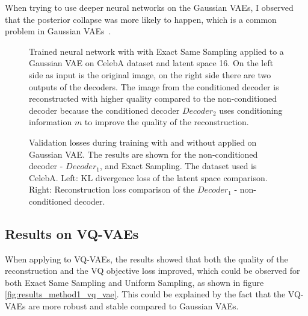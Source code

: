 When trying to use deeper neural networks on the Gaussian VAEs, I observed that the posterior collapse was more likely to happen, which is a common problem in Gaussian VAEs~\cite{wang2023posterior}.

\begin{figure}[H]
    \centering
    
    \caption[Trained neural network with  applied to a Gaussian VAE.]
    { 
        Trained neural network with  with Exact Same Sampling applied to a Gaussian VAE on CelebA dataset and latent space 16. 
        On the left side as input is the original image, on the right side there are two outputs of the decoders. 
        The image from the conditioned decoder is reconstructed with higher quality compared to the non-conditioned decoder because the conditioned decoder $Decoder_2$ uses conditioning information $m$ to improve the quality of the reconstruction.
    }
    \label{fig:res_val}
\end{figure}


\begin{figure}[H]
    \centering
    \scalebox{0.48}{}
    \scalebox{0.48}{}
    \caption[Validation loss during training of a Gaussian VAE.]
    {
        Validation losses during training with and without  applied on Gaussian VAE. The results are shown for the non-conditioned decoder - $Decoder_1$, and Exact Sampling. The dataset used is CelebA.
        Left: KL divergence loss of the latent space comparison. Right: Reconstruction loss comparison of the $Decoder_1$ - non-conditioned decoder.
    }
    \label{fig:results_method1_gaussian_vae}
\end{figure}

\subsection{Results on VQ-VAEs}

When applying  to VQ-VAEs, the results showed that both the quality of the reconstruction and the VQ objective loss improved, which could be observed for both Exact Same Sampling and Uniform Sampling, as shown in figure \ref{fig:results_method1_vq_vae}. This could be explained by the fact that the VQ-VAEs are more robust and stable compared to Gaussian VAEs.

